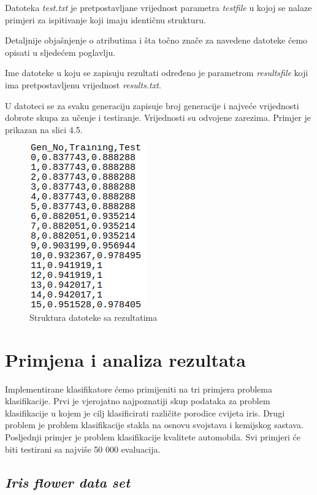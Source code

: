 \documentclass[times, utf8, zavrsni]{fer}
\begin{document}
Datoteka \textit{test.txt} je pretpostavljane vrijednost parametra \textit{testfile} u kojoj se nalaze primjeri za ispitivanje koji imaju identičnu strukturu.

Detaljnije objašnjenje o atributima i šta točno znače za navedene datoteke ćemo opisati u sljedećem poglavlju.

Ime datoteke u koju se zapisuju rezultati određeno je parametrom \textit{resultsfile} koji ima pretpostavljenu vrijednost \textit{results.txt}.

U datoteci se za svaku generaciju zapisuje broj generacije i najveće vrijednosti dobrote skupa za učenje i testiranje. Vrijednosti su odvojene zarezima. Primjer je prikazan na slici 4.5.

\begin{figure}[htb]
\centering
\includegraphics[scale=0.5]{images/rezultati}
\caption{Struktura datoteke sa rezultatima}
\end{figure}



\chapter{Primjena i analiza rezultata}

Implementirane klasifikatore ćemo primijeniti na tri primjera problema klasifikacije. Prvi je vjerojatno najpoznatiji skup podataka za problem klasifikacije u kojem je cilj klasificirati različite porodice cvijeta iris. Drugi problem je problem klasifikacije stakla na osnovu svojstava i kemijskog sastava. Posljednji primjer je problem klasifikacije kvalitete automobila. Svi primjeri će biti testirani sa najviše 50 000 evaluacija.

\section{\textit{Iris flower data set}}
\end{document}
